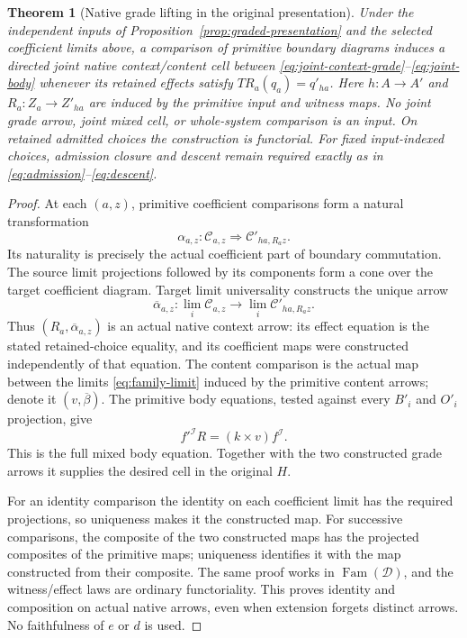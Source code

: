 \documentclass[11pt]{article}
\newtheorem{theorem}{Theorem}
\begin{document}
\begin{theorem}[Native grade lifting in the original presentation]\label{thm:grade-lifting}
Under the independent inputs of Proposition~\ref{prop:graded-presentation} and the selected coefficient limits above, a comparison of primitive boundary diagrams induces a directed joint native context/content cell between \eqref{eq:joint-context-grade}--\eqref{eq:joint-body} whenever its retained effects satisfy $TR_a(q_a)=q'_{ha}$. Here $h:A\to A'$ and $R_a:Z_a\to Z'_{ha}$ are induced by the primitive input and witness maps. No joint grade arrow, joint mixed cell, or whole-system comparison is an input. On retained admitted choices the construction is functorial. For fixed input-indexed choices, admission closure and descent remain required exactly as in \eqref{eq:admission}--\eqref{eq:descent}.
\end{theorem}
\begin{proof}
At each $(a,z)$, primitive coefficient comparisons form a natural transformation
\[
 \alpha_{a,z}:\mathcal C_{a,z}\Longrightarrow\mathcal C'_{ha,R_az}.
\]
Its naturality is precisely the actual coefficient part of boundary commutation. The source limit projections followed by its components form a cone over the target coefficient diagram. Target limit universality constructs the unique arrow
\[
 \overline\alpha_{a,z}:\lim_i\mathcal C_{a,z}\longrightarrow\lim_i\mathcal C'_{ha,R_az}.
\tag{LG}\label{eq:coefficient-lift}
\]
Thus $(R_a,\overline\alpha_{a,z})$ is an actual native context arrow: its effect equation is the stated retained-choice equality, and its coefficient maps were constructed independently of that equation. The content comparison is the actual map between the limits \eqref{eq:family-limit} induced by the primitive content arrows; denote it $(v,\overline\beta)$. The primitive body equations, tested against every $B'_i$ and $O'_i$ projection, give
\[
 f'^{\mathcal I}R=(k\times v)f^{\mathcal I}.
\]
This is the full mixed body equation. Together with the two constructed grade arrows it supplies the desired cell in the original $H$.

For an identity comparison the identity on each coefficient limit has the required projections, so uniqueness makes it the constructed map. For successive comparisons, the composite of the two constructed maps has the projected composites of the primitive maps; uniqueness identifies it with the map constructed from their composite. The same proof works in $\operatorname{Fam}(\mathcal D)$, and the witness/effect laws are ordinary functoriality. This proves identity and composition on actual native arrows, even when extension forgets distinct arrows. No faithfulness of $e$ or $d$ is used.
\end{proof}
\end{document}
